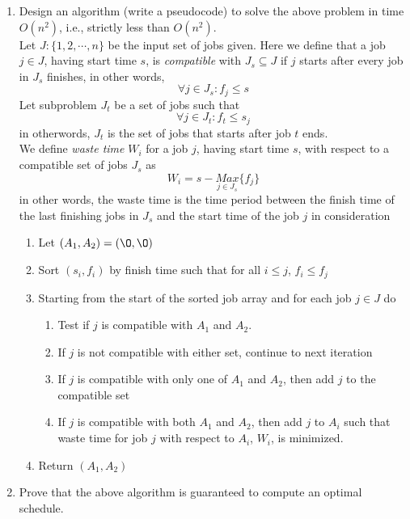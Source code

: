 \documentclass[11pt]{article}
\begin{document}
\begin{enumerate}
  \item Design an algorithm (write a pseudocode) to solve the above problem in time $O(n^2)$, i.e., strictly less than $O(n^2)$.\\

  Let $J: \{ 1, 2, \cdots, n\}$ be the input set of jobs given. Here we define that a job $j\in J$, having start time $s$, is \textit{compatible} with $J_s\subseteq J$ if $j$ starts after every job in $J_s$ finishes, in other words,
  \[
    \forall j \in J_s: f_j \leq s
  \]
  Let subproblem $J_t$ be a set of jobs such that
  \[
    \forall j \in J_t: f_t \leq s_j
  \]
  in otherwords, $J_t$ is the set of jobs that starts after job $t$ ends. \\
  We define \textit{waste time} $W_i$ for a job $j$, having start time $s$, with respect to a compatible set of jobs $J_s$ as
  \[
    W_i = s - \underset{j\in J_s}{Max}\{ f_j \}
  \]
  in other words, the waste time is the time period between the finish time of the last finishing jobs in $J_s$ and the start time of the job $j$ in consideration

  \begin{enumerate}
    \item Let $(A_1, A_2) = (\O, \O)$
    \item Sort $(s_i, f_i)$ by finish time such that for all $i\leq j$, $f_i \leq f_j$
    \item Starting from the start of the sorted job array and for each job $j \in J$ do
    \begin{enumerate}
      \item Test if $j$ is compatible with $A_1$ and $A_2$.
      \item If $j$ is not compatible with either set, continue to next iteration
      \item If $j$ is compatible with only one of $A_1$ and $A_2$, then add $j$ to the compatible set
      \item If $j$ is compatible with both $A_1$ and $A_2$, then add $j$ to $A_i$ such that waste time for job $j$ with respect to $A_i$, $W_i$, is minimized.
    \end{enumerate}
    \item Return $(A_1, A_2)$
  \end{enumerate}


  \item Prove that the above algorithm is guaranteed to compute an optimal schedule.


\end{enumerate}
\end{document}
